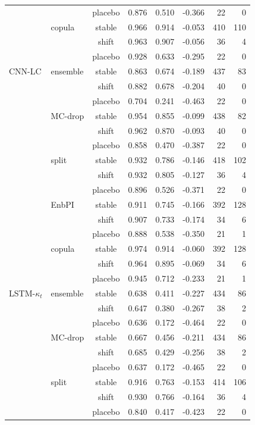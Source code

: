 {\begin{longtable}{@{}llcrrrrr@{}}
 &  & placebo & 0.876 & 0.510 & -0.366 & 22 & 0 \\
 & copula & stable & 0.966 & 0.914 & -0.053 & 410 & 110 \\
 &  & shift & 0.963 & 0.907 & -0.056 & 36 & 4 \\
 &  & placebo & 0.928 & 0.633 & -0.295 & 22 & 0 \\
\addlinespace[2pt]
CNN-LC & ensemble & stable & 0.863 & 0.674 & -0.189 & 437 & 83 \\
 &  & shift & 0.882 & 0.678 & -0.204 & 40 & 0 \\
 &  & placebo & 0.704 & 0.241 & -0.463 & 22 & 0 \\
 & MC-drop & stable & 0.954 & 0.855 & -0.099 & 438 & 82 \\
 &  & shift & 0.962 & 0.870 & -0.093 & 40 & 0 \\
 &  & placebo & 0.858 & 0.470 & -0.387 & 22 & 0 \\
 & split & stable & 0.932 & 0.786 & -0.146 & 418 & 102 \\
 &  & shift & 0.932 & 0.805 & -0.127 & 36 & 4 \\
 &  & placebo & 0.896 & 0.526 & -0.371 & 22 & 0 \\
 & EnbPI & stable & 0.911 & 0.745 & -0.166 & 392 & 128 \\
 &  & shift & 0.907 & 0.733 & -0.174 & 34 & 6 \\
 &  & placebo & 0.888 & 0.538 & -0.350 & 21 & 1 \\
 & copula & stable & 0.974 & 0.914 & -0.060 & 392 & 128 \\
 &  & shift & 0.964 & 0.895 & -0.069 & 34 & 6 \\
 &  & placebo & 0.945 & 0.712 & -0.233 & 21 & 1 \\
\addlinespace[2pt]
LSTM-$\kappa_t$ & ensemble & stable & 0.638 & 0.411 & -0.227 & 434 & 86 \\
 &  & shift & 0.647 & 0.380 & -0.267 & 38 & 2 \\
 &  & placebo & 0.636 & 0.172 & -0.464 & 22 & 0 \\
 & MC-drop & stable & 0.667 & 0.456 & -0.211 & 434 & 86 \\
 &  & shift & 0.685 & 0.429 & -0.256 & 38 & 2 \\
 &  & placebo & 0.637 & 0.172 & -0.465 & 22 & 0 \\
 & split & stable & 0.916 & 0.763 & -0.153 & 414 & 106 \\
 &  & shift & 0.930 & 0.766 & -0.164 & 36 & 4 \\
 &  & placebo & 0.840 & 0.417 & -0.423 & 22 & 0 \\

\end{longtable}}
